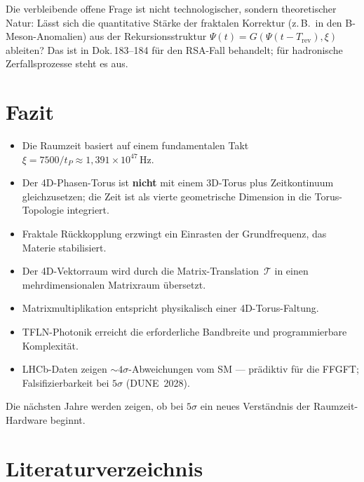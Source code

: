 Die verbleibende offene Frage ist nicht technologischer, sondern
theoretischer Natur: Lässt sich die quantitative Stärke der fraktalen
Korrektur (z.\,B.\ in den B-Meson-Anomalien) aus der Rekursionsstruktur
$\Psi(t) = G(\Psi(t-T_{\text{rev}}), \xi)$ ableiten?
Das ist in Dok.\,183--184 für den RSA-Fall behandelt;
für hadronische Zerfallsprozesse steht es aus.

\section{Fazit}

\begin{itemize}
  \item Die Raumzeit basiert auf einem fundamentalen Takt
        $\xi = 7500/t_P \approx 1{,}391 \times 10^{47}\,\text{Hz}$.
  \item Der 4D-Phasen-Torus ist \textbf{nicht} mit einem 3D-Torus plus
        Zeitkontinuum gleichzusetzen; die Zeit ist als vierte geometrische
        Dimension in die Torus-Topologie integriert.
  \item Fraktale Rückkopplung erzwingt ein Einrasten der Grundfrequenz,
        das Materie stabilisiert.
  \item Der 4D-Vektorraum wird durch die Matrix-Translation~$\mathcal{T}$
        in einen mehrdimensionalen Matrixraum übersetzt.
  \item Matrixmultiplikation entspricht physikalisch einer 4D-Torus-Faltung.
  \item TFLN-Photonik erreicht die erforderliche Bandbreite und
        programmierbare Komplexität.
  \item LHCb-Daten zeigen $\sim 4\sigma$-Abweichungen vom SM — prädiktiv
        für die FFGFT; Falsifizierbarkeit bei $5\sigma$ (DUNE~2028).
\end{itemize}

\begin{keybox}
Die nächsten Jahre werden zeigen, ob bei $5\sigma$ ein neues Verständnis
der Raumzeit-Hardware beginnt.
\end{keybox}

\newpage
\section*{Literaturverzeichnis}

